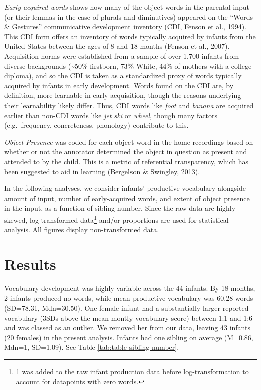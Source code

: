 \documentclass[
  english,
  man,floatsintext]{apa6}
\begin{document}
\emph{Early-acquired words} shows how many of the object words in the parental input (or their lemmas in the case of plurals and diminutives) appeared on the \enquote{Words \& Gestures} communicative development inventory (CDI, Fenson et al., 1994). This CDI form offers an inventory of words typically acquired by infants from the United States between the ages of 8 and 18 months (Fenson et al., 2007). Acquisition norms were established from a sample of over 1,700 infants from diverse backgrounds (\textasciitilde50\% firstborn, 73\% White, 44\% of mothers with a college diploma), and so the CDI is taken as a standardized proxy of words typically acquired by infants in early development. Words found on the CDI are, by definition, more learnable in early acquisition, though the reasons underlying their learnability likely differ. Thus, CDI words like \emph{foot} and \emph{banana} are acquired earlier than non-CDI words like \emph{jet ski} or \emph{wheel}, though many factors (e.g.~frequency, concreteness, phonology) contribute to this.

\emph{Object Presence} was coded for each object word in the home recordings based on whether or not the annotator determined the object in question as present and attended to by the child. This is a metric of referential transparency, which has been suggested to aid in learning (Bergelson \& Swingley, 2013).

In the following analyses, we consider infants' productive vocabulary alongside amount of input, number of early-acquired words, and extent of object presence in the input, as a function of sibling number. Since the raw data are highly skewed, log-transformed data\footnote{1 was added to the raw infant production data before log-transformation to account for datapoints with zero words.} and/or proportions are used for statistical analysis. All figures display non-transformed data.

\hypertarget{results}{%
\section{Results}\label{results}}

Vocabulary development was highly variable across the 44 infants. By 18 months, 2 infants produced no words, while mean productive vocabulary was 60.28 words (SD=78.31, Mdn=30.50). One female infant had a substantially larger reported vocabulary (3SDs above the mean montly vocabulary score) between 1;1 and 1;6 and was classed as an outlier. We removed her from our data, leaving 43 infants (20 females) in the present analysis. Infants had one sibling on average (M=0.86, Mdn=1, SD=1.09). See Table \ref{tab:table-sibling-number}.
\end{document}
